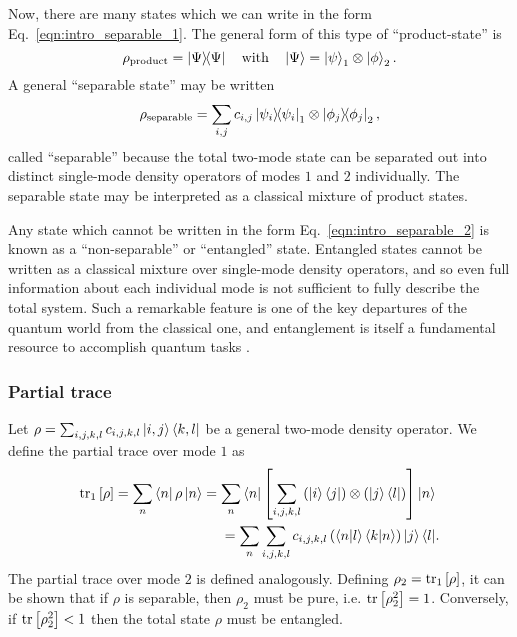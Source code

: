 Now, there are many states which we can write in the form Eq.~\ref{eqn:intro_separable_1}. The general form of this type of ``product-state'' is
\begin{equation}
\rho_{\text{product}} = \dyad{\Psi} \qq{with} \ket{\Psi} = \ket{\psi}_1 \otimes \ket{\phi}_2.
\end{equation}
A general ``separable state'' may be written
\begin{equation}\label{eqn:intro_separable_2}
\rho_{\text{separable}} = \sum_{i, j} c_{i, j} \dyad{\psi_i}_1 \otimes \dyad{\phi_j}_2,
\end{equation}
called ``separable'' because the total two-mode state can be separated out into distinct single-mode density operators of modes $1$ and $2$ individually. The separable state may be interpreted as a classical mixture of product states.

Any state which cannot be written in the form Eq.~\ref{eqn:intro_separable_2} is known as a ``non-separable'' or ``entangled'' state. Entangled states cannot be written as a classical mixture over single-mode density operators, and so even full information about each individual mode is not sufficient to fully describe the total system. Such a remarkable feature is one of the key departures of the quantum world from the classical one, and entanglement is itself a fundamental resource to accomplish quantum tasks \cite{Horodecki2009b, Eisert2003}.

\subsubsection{Partial trace}
Let $\rho = \sum_{i, j, k, l} c_{i, j, k, l} \ket{i, j}\bra{k, l}$ be a general two-mode density operator. We define the partial trace over mode $1$ as
\begin{align*}
\tr_1\left[\rho\right] = \sum_n \bra{n}\rho\ket{n} = \sum_n \bra{n} \left[\sum_{i, j, k, l} \left(\ket{i}\bra{j}\right) \otimes \left(\ket{j}\bra{l}\right) \right] \ket{n}& \\
= \sum_n \sum_{i, j, k, l} c_{i, j, k, l} \left(\ip{n}{l} \ip{k}{n} \right) \ket{j}\bra{l}&.
\end{align*}
The partial trace over mode $2$ is defined analogously. Defining $\rho_2 = \tr_1\left[\rho\right]$, it can be shown that if $\rho$ is separable, then $\rho_2$ must be pure, i.e. $\tr\left[\rho_2^2\right]=1$. Conversely, if $\tr\left[\rho_2^2\right] < 1$ then the total state $\rho$ must be entangled.







